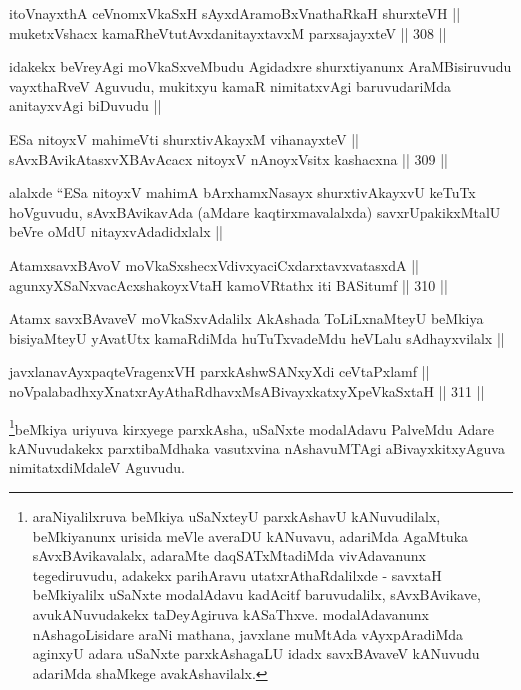 
\begin{shl}
itoV\s nayxthA ceVnomxVkaSxH sAyxdAramoBxV\s nathaRkaH shurxteVH || \\
muketxVshacx kamaRheVtutAvxdanitayxtavxM parxsajayxteV ||  308 || 
\end{shl}

\begin{artha}
idakekx beVreyAgi moVkaSxveMbudu Agidadxre shurxtiyanunx
AraMBisiruvudu vayxthaRveV Aguvudu, mukitxyu kamaR nimitatxvAgi
baruvudariMda anitayxvAgi biDuvudu ||
\end{artha}

\begin{shl}
ESa nitoyxV mahimeVti shurxtivAkayxM vihanayxteV || \\
sAvxBAvikAtasxvXBAvAcacx nitoyxV nAnoyxV\s sitx kashacxna ||  309 ||  
\end{shl}

\begin{artha}
alalxde ``ESa nitoyxV mahimA bArxhamxNasayx shurxtivAkayxvU keTuTx
hoVguvudu, sAvxBAvikavAda (aMdare kaqtirxmavalalxda) savxrUpakikxMtalU
beVre oMdU nitayxvAdadidxlalx || 
\end{artha}


\begin{shl}
AtamxsavxBAvoV moVkaSxshecxVdivxyaciCxdarxtavxvatasxdA || \\
agunxyXSaNxvacAcxshakoyxV\s taH kamoVRtathx iti BASitumf ||  310 ||  
\end{shl}

\begin{artha}
Atamx savxBAvaveV moVkaSxvAdalilx AkAshada ToLiLxnaMteyU beMkiya
bisiyaMteyU yAvatUtx kamaRdiMda huTuTxvadeMdu heVLalu sAdhayxvilalx ||
\end{artha}


\begin{shl}
javxlanavAyxpaqteVragenxVH parxkAshwSANxyXdi ceVtaPxlamf || \\
noVpalabadhxyXnatxrAyAthaRdhavxMsABivayxkatxyXpeVkaSxtaH ||  311 ||  
\end{shl}

\begin{artha}
\footnote{araNiyalilxruva beMkiya uSaNxteyU parxkAshavU kANuvudilalx,
  beMkiyanunx urisida meVle averaDU kANuvavu, adariMda AgaMtuka
  sAvxBAvikavalalx, adaraMte daqSATxMtadiMda vivAdavanunx
  tegediruvudu, adakekx parihAravu utatxrAthaRdalilxde - savxtaH
  beMkiyalilx uSaNxte modalAdavu kadAcitf baruvudalilx, sAvxBAvikave,
  avukANuvudakekx taDeyAgiruva kASaThxve. modalAdavanunx
  nAshagoLisidare araNi mathana, javxlane muMtAda vAyxpAradiMda
  aginxyU adara uSaNxte parxkAshagaLU idadx savxBAvaveV kANuvudu
  adariMda  shaMkege avakAshavilalx.}beMkiya uriyuva kirxyege parxkAsha, uSaNxte modalAdavu PalveMdu Adare
kANuvudakekx parxtibaMdhaka vasutxvina nAshavuMTAgi aBivayxkitxyAguva
nimitatxdiMdaleV Aguvudu.
\end{artha}

